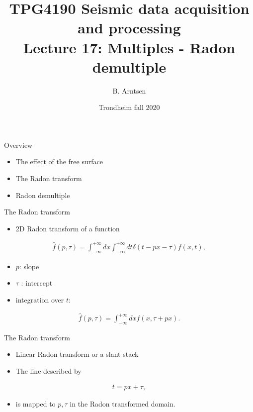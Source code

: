 \documentclass[xcolor=dvipsnames,notes]{beamer}
\begin{document}
\title{TPG4190 Seismic data acquisition and processing \\
               Lecture 17: Multiples - Radon demultiple}
\author{B. Arntsen}
\date{Trondheim fall 2020}
\begin{frame}
 \titlepage
\end{frame}
%
\begin{frame}{Overview}
\begin{itemize}
  \item The effect of the free surface
  \item The Radon transform
  \item Radon demultiple
\end{itemize}
\end{frame}
%
\begin{frame}{The Radon transform}
\begin{itemize}
   \item 2D Radon transform of a function
\end{itemize}
%
\begin{eqnarray}
  \hat{f}(p,\tau) = \int^{+\infty}_{-\infty} dx \int^{+\infty}_{-\infty} dt \delta(t-px-\tau)f(x,t),
                   \label{eq:radon}
\end{eqnarray}
%
\begin{itemize}
 \item $p$: slope 
 \item $\tau$ : intercept
 \item integration over $t$:
\end{itemize}
%
\begin{eqnarray}
  \hat{f}(p,\tau) = \int^{+\infty}_{-\infty} dx f(x,\tau+px).
                   \label{eq:slant}
\end{eqnarray}
%
\end{frame}
%
\begin{frame}{The Radon transform}
\sf
\begin{itemize}
\item Linear Radon transform or a slant stack
\item The line described by
\end{itemize}
%
\begin{eqnarray}
  t=p x+\tau,
\end{eqnarray}
% 
\begin{itemize}
  \item is mapped to $p,\tau$ in the Radon transformed domain.
\end{itemize}
\end{frame}
\end{document}

